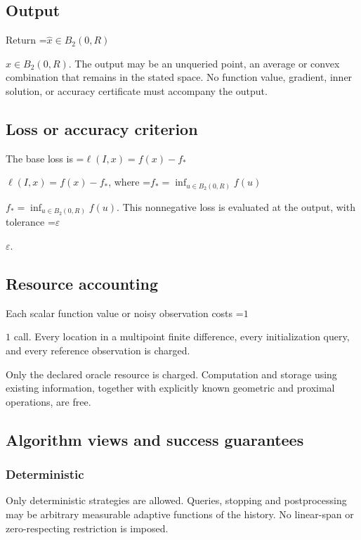 \documentclass[10pt,a4paper]{article}
\newcommand{\AtlasMath}[1]{\par\begingroup\centering\setbox0=\hbox{$\displaystyle #1$}\ifdim\wd0>1.4\linewidth\typeout{ATLAS WIDE FORMULA: \the\wd0}\fi\ifdim\wd0>\linewidth\resizebox{\linewidth}{!}{\box0}\else\box0\fi\par\endgroup}
\newcommand{\AtlasInlineMath}[1]{\begingroup\setbox0=\hbox{$#1$}\ifdim\wd0>.4\linewidth\endgroup\AtlasMath{#1}\else\endgroup$#1$\fi}
\begin{document}
\subsection{Output}


Return \AtlasInlineMath{\widehat{x}\in B_2(0,R)}. The output may be an unqueried point, an average or convex combination that remains in the stated space. No function value, gradient, inner solution, or accuracy certificate must accompany the output.



\subsection{Loss or accuracy criterion}


The base loss is \AtlasInlineMath{\ell(I,x)=f(x)-f_*}, where \AtlasInlineMath{f_*=\inf_{u\in B_2(0,R)}f(u)}. This nonnegative loss is evaluated at the output, with tolerance \AtlasInlineMath{\varepsilon}.



\subsection{Resource accounting}


Each scalar function value or noisy observation costs \AtlasInlineMath{1} call. Every location in a multipoint finite difference, every initialization query, and every reference observation is charged.



Only the declared oracle resource is charged. Computation and storage using existing information, together with explicitly known geometric and proximal operations, are free.



\subsection{Algorithm views and success guarantees}


\subsubsection{Deterministic}


Only deterministic strategies are allowed. Queries, stopping and postprocessing may be arbitrary measurable adaptive functions of the history. No linear-span or zero-respecting restriction is imposed.
\end{document}
